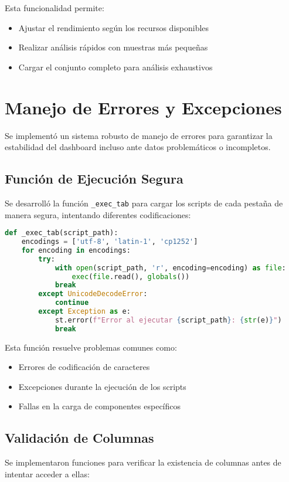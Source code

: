 Esta funcionalidad permite:
\begin{itemize}
    \item Ajustar el rendimiento según los recursos disponibles
    \item Realizar análisis rápidos con muestras más pequeñas
    \item Cargar el conjunto completo para análisis exhaustivos
\end{itemize}

\section{Manejo de Errores y Excepciones}
Se implementó un sistema robusto de manejo de errores para garantizar la estabilidad del dashboard incluso ante datos problemáticos o incompletos.

\subsection{Función de Ejecución Segura}
Se desarrolló la función \texttt{\_exec\_tab} para cargar los scripts de cada pestaña de manera segura, intentando diferentes codificaciones:

\begin{lstlisting}[language=Python, caption=Función de ejecución segura]
def _exec_tab(script_path):
    encodings = ['utf-8', 'latin-1', 'cp1252']
    for encoding in encodings:
        try:
            with open(script_path, 'r', encoding=encoding) as file:
                exec(file.read(), globals())
            break
        except UnicodeDecodeError:
            continue
        except Exception as e:
            st.error(f"Error al ejecutar {script_path}: {str(e)}")
            break
\end{lstlisting}

Esta función resuelve problemas comunes como:
\begin{itemize}
    \item Errores de codificación de caracteres
    \item Excepciones durante la ejecución de los scripts
    \item Fallas en la carga de componentes específicos
\end{itemize}

\subsection{Validación de Columnas}
Se implementaron funciones para verificar la existencia de columnas antes de intentar acceder a ellas:

